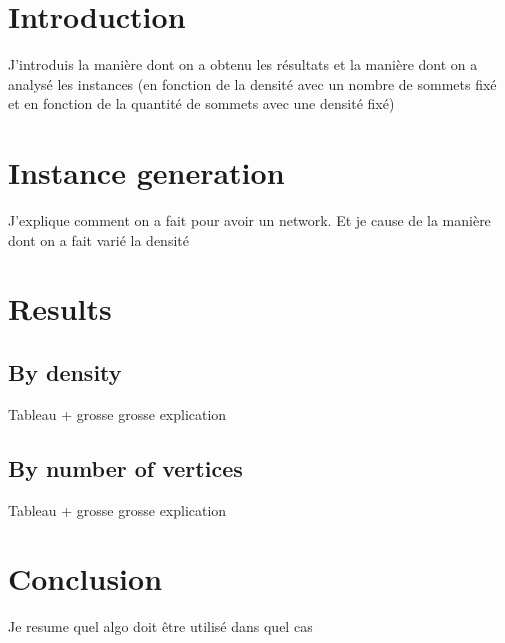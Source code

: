 \section{Introduction}
J'introduis la manière dont on a obtenu les résultats et la manière dont on a analysé les instances (en fonction de la densité avec un nombre de sommets fixé et en fonction de la quantité de sommets avec une densité fixé)
\section{Instance generation}
J'explique comment on a fait pour avoir un network. Et je cause de la manière dont on a fait varié la densité
\section{Results}
\subsection{By density}
Tableau + grosse grosse explication
\subsection{By number of vertices}
Tableau + grosse grosse explication
\section{Conclusion}
Je resume quel algo doit être utilisé dans quel cas